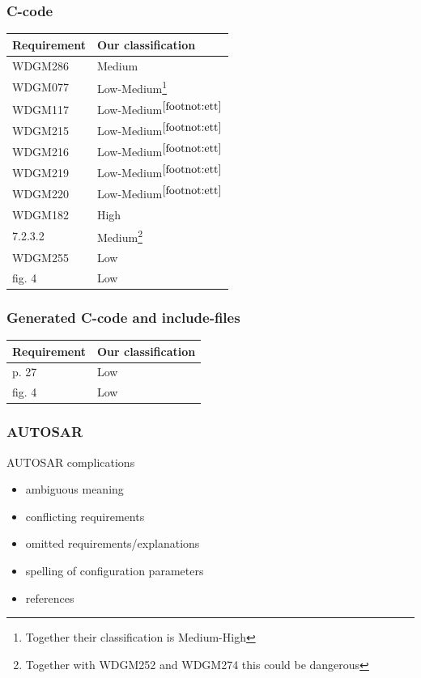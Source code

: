 \documentclass{beamer}
\begin{document}
\begin{frame}
  \frametitle{C-code}
  \begin{tabular}{l l}
    Requirement & Our classification\\\hline
    WDGM286 & Medium\\
    WDGM077 & Low-Medium\footnote{\label{footnot:ett} Together their classification is Medium-High}\\
    WDGM117 & Low-Medium$^{\ref{footnot:ett}}$ \\
    WDGM215 & Low-Medium$^{\ref{footnot:ett}}$ \\
    WDGM216 & Low-Medium$^{\ref{footnot:ett}}$ \\
    WDGM219 & Low-Medium$^{\ref{footnot:ett}}$ \\
    WDGM220 & Low-Medium$^{\ref{footnot:ett}}$ \\
    WDGM182 & High\\
    7.2.3.2 & Medium\footnote{\label{footnot:tva} Together with WDGM252 and WDGM274
      this could be dangerous}\\
    WDGM255 & Low\\
    fig. 4  & Low
  \end{tabular}
\end{frame}


\begin{frame}
  \frametitle{Generated C-code and include-files}
  \begin{tabular}{l l}
    Requirement & Our classification\\\hline
    p. 27       & Low\\
    fig. 4      & Low\\
  \end{tabular}
\end{frame}


\begin{frame}
  \frametitle{AUTOSAR}
  AUTOSAR complications
  \begin{itemize}
    \item ambiguous meaning
    \item conflicting requirements
    \item omitted requirements/explanations
    \item spelling of configuration parameters
    \item references
  \end{itemize}
\end{frame}
\end{document}
